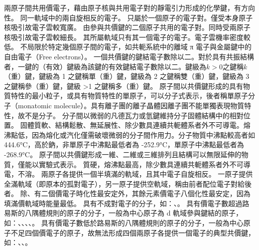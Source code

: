 \documentclass[a4paper,12pt]{report}
\begin{document}
兩原子間共用價電子，藉由原子核與共用電子對的靜電引力形成的化學鍵，有方向性。
同一軌域中的兩自旋相反的電子。
只屬於一個原子的電子對。僅受本身原子核吸引故電子雲較寬廣。
由參與共價鍵的二個原子共用的電子對。同時受兩原子核吸引故電子雲較細長。
其所屬軌域只有其一個電子的電子。電子雲機率密度較低。
不局限於特定幾個原子間的電子，如共軛系統中的離域 π 電子與金屬鍵中的自由電子（Free electrons）。
一個共價鍵的鍵結電子數除以二。對於具有共振結構者，一鍵的（有效）鍵級為該鍵的有效鍵結電子數除以二。鍵級為$k>0$之鍵稱$k$（重）鍵，鍵級為 1 之鍵稱單（重）鍵，鍵級為 2 之鍵稱雙（重）鍵，鍵級為 3 之鍵稱參（重）鍵，鍵級 >1 之鍵稱多（重）鍵。
原子間以共價鍵形成的具有物質特性的最小粒子，或具有物質特性的單原子，可以分子式表示，後者稱單原子分子（monatomic molecule）。具有離子團的離子晶體因離子團不能單獨表現物質特性，故不是分子。
分子間以微弱的凡德瓦力或氫鍵維持分子固體結構中的相對位置。
固體質軟、結構鬆散、無延展性、除少數具連續共軛體系者外不可導電。熔沸點低，因為熔化或汽化僅需破壞微弱的分子間作用力。分子物質中沸點較高者如  444.6°C，高於鈉，非單原子中沸點最低者為  -252.9°C，單原子中沸點最低者為  -268.9°C。
原子間以共價鍵形成一維、二維或三維排列且結構可以無限延伸的物質，僅能以實驗式表示。
質硬，熔沸點最高，除少數具連續共軛體系者外不可導電，不溶。
兩原子各提供一個半填滿的軌域，且其中電子自旋相反。
一原子提供全滿軌域（即原本的孤對電子），另一原子提供空軌域，稱由前者配位電子對給後者。
除、有二個價電子時化性最安定外，其餘元素價電子八個化性最安定，因為填滿價軌域時能量最低。
具有不成對電子的分子，如：、。
具有價電子數超過路易斯的八隅體規則的原子的分子，一般為中心原子為 d 軌域參與鍵結的原子，如：、、、、。
具有價電子數低於路易斯的八隅體規則的原子的分子，一般為中心原子不足四個價電子的原子，故無法形成四個兩原子各提供一個電子的典型共價鍵，如：、、。
\end{document}
